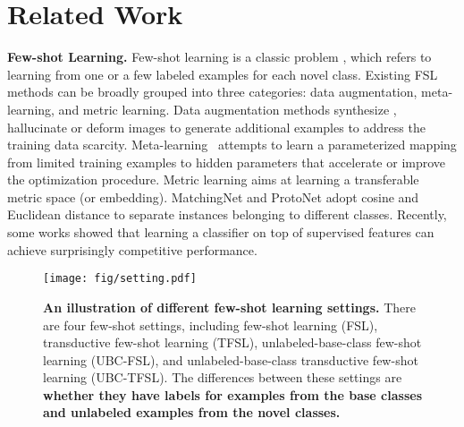 \documentclass[final]{cvpr}
\newcommand{\secvspace}{\vspace{-0.0em}}
\newcommand{\figvspace}{\vspace{-0.2em}}
\newcommand{\captionvspace}{\vspace{-0.1em}}
\begin{document}
\secvspace
\section{Related Work}
\secvspace

\textbf{Few-shot Learning.} Few-shot learning is a classic problem \cite{miller2000learning}, which refers to learning from one or a few labeled examples for each novel class. Existing FSL methods can be broadly grouped into three categories: data augmentation, meta-learning, and metric learning. Data augmentation methods synthesize \cite{imaginaryData,Delta-encoder,chen2019multi}, hallucinate \cite{2017ICCVaug} or deform \cite{chen2019image} images to generate additional examples to address the training data scarcity. Meta-learning~\cite{MAML,Sachin2017,MetaNetwork,lee2019meta} attempts to learn a parameterized mapping from limited training examples to hidden parameters that accelerate or improve the optimization procedure. Metric learning \cite{relation_net,bateni2020improved,li2020boosting} aims at learning a transferable metric space (or embedding). MatchingNet \cite{matchingnet_1shot} and ProtoNet \cite{prototype_network} adopt cosine and Euclidean distance to separate instances belonging to different classes. Recently, some works \cite{chen2019multi,liu2020negative,tian2020rethinking} showed that learning a classifier on top of supervised features can achieve surprisingly competitive performance. 













\begin{figure*}[t]
  \centering
  \texttt{[image: fig/setting.pdf]}
  \captionvspace
  \vspace{-0.2cm}
  \caption{\textbf{An illustration of different few-shot learning settings.} There are four few-shot settings, including few-shot learning (FSL), transductive few-shot learning (TFSL), unlabeled-base-class few-shot learning (UBC-FSL), and unlabeled-base-class transductive few-shot learning (UBC-TFSL).
  The differences between these settings are \textbf{whether they have labels for examples from the base classes and unlabeled examples from the novel classes.} }
  \label{fig:setting}
  \figvspace
\end{figure*}
\end{document}
